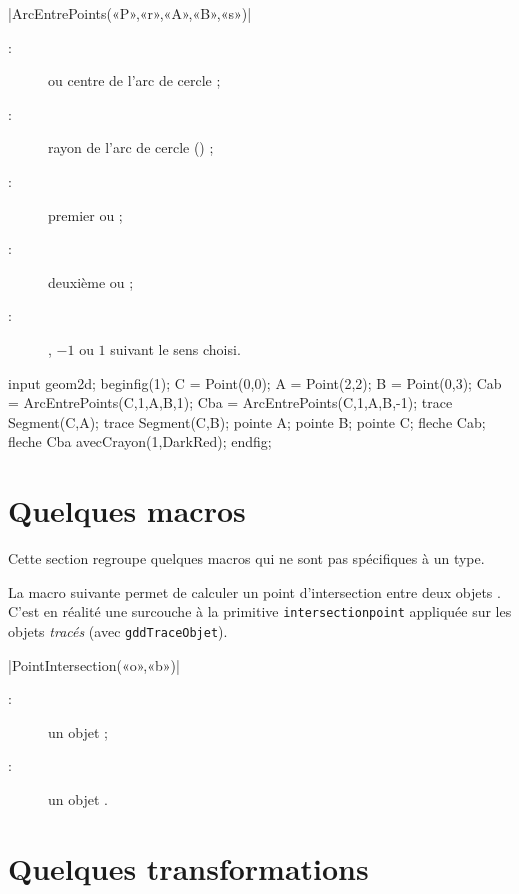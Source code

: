 \documentclass[a4paper,french]{article}
\begin{document}
\begin{colourband}
\macro|ArcEntrePoints(«P»,«r»,«A»,«B»,«s»)|
\begin{description}
  \item[:]  ou  centre de l'arc de cercle ;
  \item[:] rayon de l'arc de cercle () ;
  \item[:] premier   ou  ;
  \item[:] deuxième   ou  ;
  \item[:] , $-1$ ou $1$ suivant le sens choisi.
\end{description}
\end{colourband}

\begin{ExempleMP}
input geom2d;
beginfig(1);
C = Point(0,0);
A = Point(2,2);
B = Point(0,3);
Cab = ArcEntrePoints(C,1,A,B,1);
Cba = ArcEntrePoints(C,1,A,B,-1);
trace Segment(C,A);
trace Segment(C,B);
pointe A; pointe B; pointe C;
fleche Cab;
fleche Cba avecCrayon(1,DarkRed);
endfig;
\end{ExempleMP}

\section{Quelques macros}

Cette section regroupe quelques macros qui ne sont pas spécifiques à un type. 
\bigskip

La macro suivante permet de calculer un point d’intersection entre deux objets
\mpgeomdd. C’est en réalité une surcouche à la primitive \MP{}
\lstinline|intersectionpoint| appliquée sur les objets \emph{tracés} (avec
\lstinline+gddTraceObjet+). 
\begin{colourband}
\macro|PointIntersection(«o»,«b»)|
\begin{description}
  \item[:] un objet \mpgeomdd ;
  \item[:] un objet \mpgeomdd.
\end{description}
\end{colourband}

\section{Quelques transformations}
\end{document}
